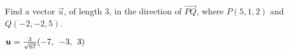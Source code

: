 
\begin{Exercise}[
name={},
title={}, 
difficulty=0,
origin={\cite{MB}}]
Find a vector $\vec{u}$, of length 3, in the direction of $\vec{PQ}$, where $P(5,1,2)$ and $Q(-2,-2,5)$.
\end{Exercise}
\begin{Answer}
$\vec{u}=\frac{3}{\sqrt{67}}\rowvec{-7,&-3,&3}$
\end{Answer}
